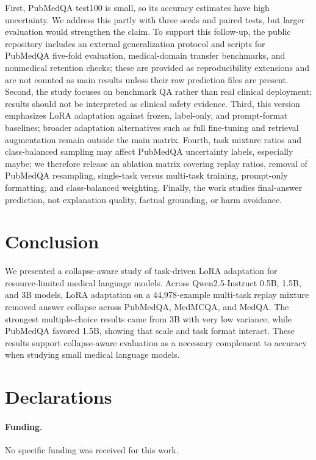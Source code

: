 \documentclass[11pt]{article}
\begin{document}
First, PubMedQA test100 is small, so its accuracy estimates have high uncertainty. We address this partly with three seeds and paired tests, but larger evaluation would strengthen the claim. To support this follow-up, the public repository includes an external generalization protocol and scripts for PubMedQA five-fold evaluation, medical-domain transfer benchmarks, and nonmedical retention checks; these are provided as reproducibility extensions and are not counted as main results unless their raw prediction files are present. Second, the study focuses on benchmark QA rather than real clinical deployment; results should not be interpreted as clinical safety evidence. Third, this version emphasizes LoRA adaptation against frozen, label-only, and prompt-format baselines; broader adaptation alternatives such as full fine-tuning and retrieval augmentation remain outside the main matrix. Fourth, task mixture ratios and class-balanced sampling may affect PubMedQA uncertainty labels, especially maybe; we therefore release an ablation matrix covering replay ratios, removal of PubMedQA resampling, single-task versus multi-task training, prompt-only formatting, and class-balanced weighting. Finally, the work studies final-answer prediction, not explanation quality, factual grounding, or harm avoidance.

\section{Conclusion}

We presented a collapse-aware study of task-driven LoRA adaptation for resource-limited medical language models. Across Qwen2.5-Instruct 0.5B, 1.5B, and 3B models, LoRA adaptation on a 44,978-example multi-task replay mixture removed answer collapse across PubMedQA, MedMCQA, and MedQA. The strongest multiple-choice results came from 3B with very low variance, while PubMedQA favored 1.5B, showing that scale and task format interact. These results support collapse-aware evaluation as a necessary complement to accuracy when studying small medical language models.

\section*{Declarations}

\paragraph{Funding.}
No specific funding was received for this work.
\end{document}
